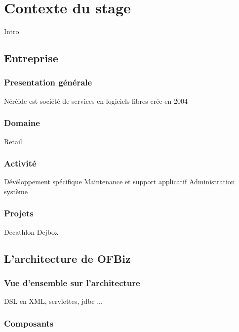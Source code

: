 \chapter{Contexte du stage}

Intro

\section{Entreprise}

\subsection{Presentation générale }
Néréide est société de services en logiciels libres crée en 2004  


























\subsection{Domaine}
Retail
\subsection{Activité}
Dévéloppement spécifique 
Maintenance et support applicatif
Administration système
\subsection{Projets}
Decathlon
Dejbox








\section{L'architecture de OFBiz}
\subsection{Vue d'ensemble sur l'architecture}
DSL en XML, servlettes, jdbc ...
\subsection{Composants }

